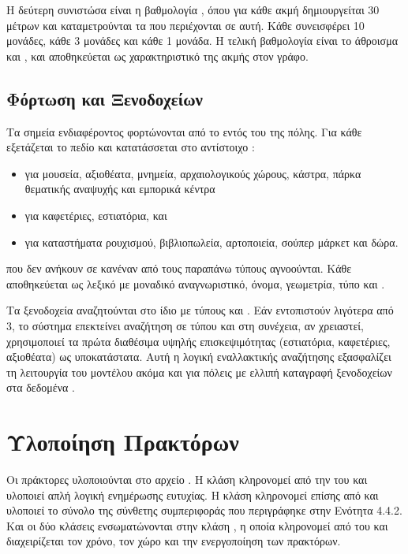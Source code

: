 Η δεύτερη συνιστώσα είναι η βαθμολογία , όπου
για κάθε ακμή δημιουργείται  30 μέτρων και
καταμετρούνται τα  που περιέχονται σε αυτή. Κάθε
 συνεισφέρει 10 μονάδες, κάθε  3 μονάδες
και κάθε  1 μονάδα. Η τελική βαθμολογία είναι το
άθροισμα  και , και αποθηκεύεται ως
χαρακτηριστικό της ακμής στον γράφο.

\subsection{Φόρτωση  και Ξενοδοχείων}

Τα σημεία ενδιαφέροντος φορτώνονται από το
 εντός του 
της πόλης. Για κάθε  εξετάζεται το πεδίο  και
κατατάσσεται στο αντίστοιχο :
\begin{itemize}
\item {} για μουσεία, αξιοθέατα, μνημεία, αρχαιολογικούς
χώρους, κάστρα, πάρκα θεματικής αναψυχής και εμπορικά κέντρα
\item {} για καφετέριες, εστιατόρια, 
και 
\item {} για καταστήματα ρουχισμού, βιβλιοπωλεία,
αρτοποιεία, σούπερ μάρκετ και δώρα.
\end{itemize}
 που δεν ανήκουν σε κανέναν από τους παραπάνω τύπους
αγνοούνται. Κάθε  αποθηκεύεται ως λεξικό με μοναδικό
αναγνωριστικό, όνομα, γεωμετρία, τύπο  και .

Τα ξενοδοχεία αναζητούνται στο ίδιο  με τύπους
 και . Εάν εντοπιστούν
λιγότερα από 3, το σύστημα επεκτείνει αναζήτηση σε  τύπου
 και στη συνέχεια, αν χρειαστεί, χρησιμοποιεί
τα πρώτα διαθέσιμα  υψηλής επισκεψιμότητας (εστιατόρια,
καφετέριες, αξιοθέατα) ως υποκατάστατα. Αυτή η λογική εναλλακτικής
αναζήτησης εξασφαλίζει τη λειτουργία του μοντέλου ακόμα και για
πόλεις με ελλιπή καταγραφή ξενοδοχείων στα δεδομένα .

\section{Υλοποίηση Πρακτόρων}

Οι πράκτορες υλοποιούνται στο αρχείο . Η κλάση
 κληρονομεί από την  του 
και υλοποιεί απλή λογική ενημέρωσης ευτυχίας. Η κλάση
 κληρονομεί επίσης από  και υλοποιεί
το σύνολο της σύνθετης συμπεριφοράς που περιγράφηκε στην
Ενότητα 4.4.2. Και οι δύο κλάσεις ενσωματώνονται στην κλάση
, η οποία κληρονομεί από  του 
και διαχειρίζεται τον χρόνο, τον χώρο και την ενεργοποίηση των
πρακτόρων.

